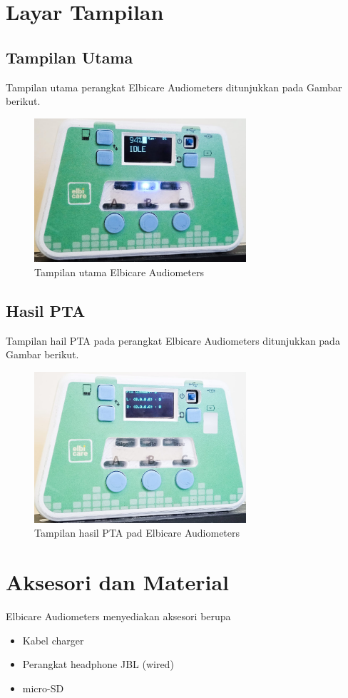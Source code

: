 \documentclass[11pt,a4paper,twoside,onecolumn]{book}
\begin{document}
		\section{Layar Tampilan}
		\subsection{Tampilan Utama}
		Tampilan utama perangkat Elbicare Audiometers ditunjukkan pada Gambar berikut.		
		\begin{figure}[H]
			\centering
			\includegraphics[width=0.7\textwidth]{images/depan-idle}
			\caption{Tampilan utama Elbicare Audiometers}
		\end{figure}	
		
		\subsection{Hasil PTA}
		Tampilan hail PTA pada perangkat Elbicare Audiometers ditunjukkan pada Gambar berikut.		
		\begin{figure}[H]
			\centering
			\includegraphics[width=0.7\textwidth]{images/depan-PTA}
			\caption{Tampilan hasil PTA pad Elbicare Audiometers}
		\end{figure}
		
		\section{Aksesori dan Material}
		Elbicare Audiometers menyediakan aksesori berupa
		\begin{itemize}
			\item Kabel charger
			\item Perangkat headphone JBL (wired)
			\item micro-SD
		\end{itemize}
		
\end{document}
